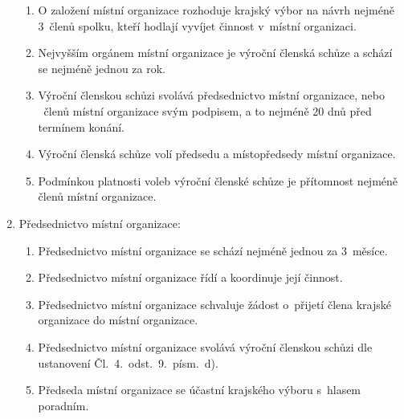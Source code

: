 \documentclass[a4paper]{article}
\begin{document}
\begin{enumerate}
\begin{enumerate}
        \item O založení místní organizace rozhoduje krajský výbor na
            návrh nejméně 3~členů spolku, kteří hodlají vyvíjet činnost
            v~místní organizaci.

        \item Nejvyšším orgánem místní organizace je výroční členská schůze a
            schází se nejméně jednou za rok.

        \item Výroční členskou schůzi svolává předsednictvo místní organizace,
            nebo ~členů místní organizace svým podpisem, a to
            nejméně 20 dnů před termínem konání.

        \item Výroční členská schůze volí předsedu a místopředsedy místní
            organizace.

        \item Podmínkou platnosti voleb výroční členské schůze
            je přítomnost nejméně  členů místní organizace.
        \end{enumerate}


    \item Předsednictvo místní organizace:
        \begin{enumerate}
        \item Předsednictvo místní organizace se schází nejméně jednou za
            3~měsíce.

        \item Předsednictvo místní organizace řídí a koordinuje její činnost.

        \item Předsednictvo místní organizace schvaluje žádost o~přijetí
            člena krajské organizace do místní organizace.

        \item Předsednictvo místní organizace svolává výroční členskou
            schůzi dle ustanovení Čl.~4.~odst.~9.~písm.~d).

        \item Předseda místní organizace se účastní krajského výboru
            s~hlasem poradním.
        \end{enumerate}
    \end{enumerate}
\end{document}
